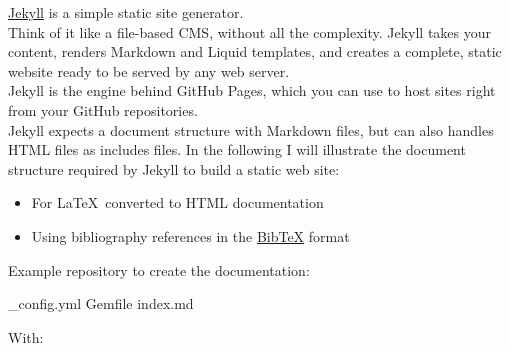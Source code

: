 \href{https://jekyllrb.com}{Jekyll} is a simple static site generator. \\
Think of it like a file-based CMS, without all the complexity. Jekyll takes your content, renders Markdown and Liquid templates, 
and creates a complete, static website ready to be served by any web server. \\
Jekyll is the engine behind GitHub Pages, which you can use to host sites right from your GitHub repositories. \\[0.25cm]
Jekyll expects a document structure with Markdown files, but can also handles HTML files as includes files. 
In the following I will illustrate the document structure required by Jekyll to build a static web site: 
\begin{itemize}
\item For \LaTeX\ converted to HTML documentation
\item Using bibliography references in the \href{https://www.bibtex.org/}{Bib\TeX} format
\end{itemize}
Example repository to create the documentation: 
{\footnotesize{ 
\begin{script}
 
      \_config.yml  Gemfile    index.md
\end{script}
}}
\noindent With:

